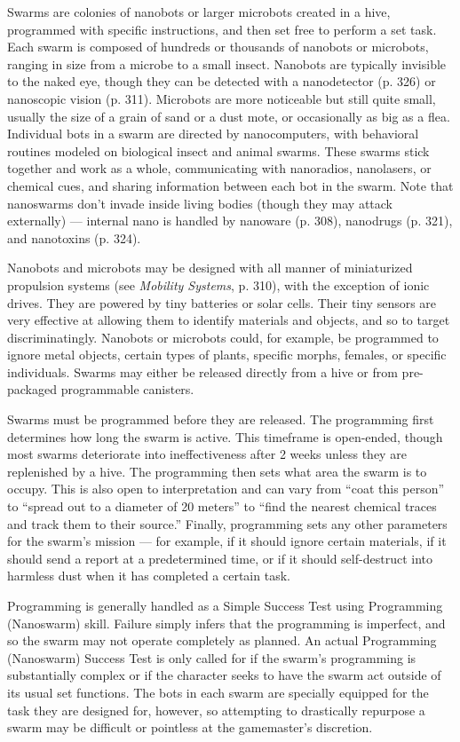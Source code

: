 Swarms are colonies of nanobots or larger microbots created in a hive, programmed with specific instructions, and then set free to perform a set task. Each swarm is composed of hundreds or thousands of nanobots or microbots, ranging in size from a microbe to a small insect. Nanobots are typically invisible to the naked eye, though they can be detected with a nanodetector (p. 326) or nanoscopic vision (p. 311). Microbots are more noticeable but still quite small, usually the size of a grain of sand or a dust mote, or occasionally as big as a flea. Individual bots in a swarm are directed by nanocomputers, with behavioral routines modeled on biological insect and animal swarms. These swarms stick together and work as a whole, communicating with nanoradios, nanolasers, or chemical cues, and sharing information between each bot in the swarm. Note that nanoswarms don’t invade inside living bodies (though they may attack externally) --- internal nano is handled by nanoware (p. 308), nanodrugs (p. 321), and nanotoxins (p. 324). 

Nanobots and microbots may be designed with all manner of miniaturized propulsion systems (see \emph{Mobility Systems}, p. 310), with the exception of ionic drives. They are powered by tiny batteries or solar cells. Their tiny sensors are very effective at allowing them to identify materials and objects, and so to target discriminatingly. Nanobots or microbots could, for example, be programmed to ignore metal objects, certain types of plants, specific morphs, females, or specific individuals. Swarms may either be released directly from a hive or from pre-packaged programmable canisters. 

Swarms must be programmed before they are released. The programming first determines how long the swarm is active. This timeframe is open-ended, though most swarms deteriorate into ineffectiveness after 2 weeks unless they are replenished by a hive. The programming then sets what area the swarm is to occupy. This is also open to interpretation and can vary from ``coat this person'' to ``spread out to a diameter of 20 meters'' to ``find the nearest chemical traces and track them to their source.'' Finally, programming sets any other parameters for the swarm’s mission --- for example, if it should ignore certain materials, if it should send a report at a predetermined time, or if it should self-destruct into harmless dust when it has completed a certain task. 

Programming is generally handled as a Simple Success Test using Programming (Nanoswarm) skill. Failure simply infers that the programming is imperfect, and so the swarm may not operate completely as planned. An actual Programming (Nanoswarm) Success Test is only called for if the swarm’s programming is substantially complex or if the character seeks to have the swarm act outside of its usual set functions. The bots in each swarm are specially equipped for the task they are designed for, however, so attempting to drastically repurpose a swarm may be difficult or pointless at the gamemaster’s discretion. 

